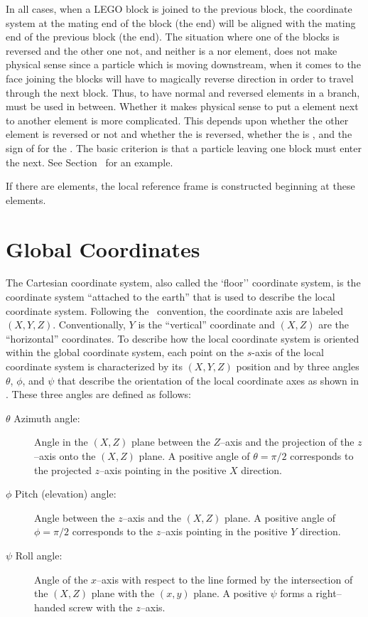 In all cases, when a LEGO block is joined to the previous block, the
coordinate system at the mating end of the block (the 
end) will be aligned with the mating end of the previous block (the
 end). The situation where one of the blocks is
reversed and the other one not, and neither is a  nor
 element, does not make physical sense since a
particle which is moving downstream, when it comes to the face joining
the blocks will have to magically reverse direction in order to travel
through the next block. Thus, to have normal and reversed elements in
a branch,   must be used in between.
Whether it makes physical sense to put a  element next to
another element is more complicated. This depends upon whether the
other element is reversed or not and whether the  is
reversed, whether the  is , and the sign of
 for the . The basic criterion is that a
particle leaving one block must enter the next. See
Section~ for an example.

If there are  elements, the local reference frame is
constructed beginning at these elements.

\section{Global Coordinates}
\label{s:global}

The Cartesian  coordinate system, also called the `floor''
coordinate system, is the coordinate system ``attached to the earth''
that is used to describe the local coordinate system. Following the
\mad\ convention, the  coordinate axis are labeled $(X, Y,
Z)$. Conventionally, $Y$ is the ``vertical'' coordinate and $(X, Z)$
are the ``horizontal'' coordinates. To describe how the local
coordinate system is oriented within the global coordinate system,
each point on the $s$-axis of the local coordinate system is
characterized by its $(X, Y, Z)$ position and by three angles $\theta$,
$\phi$, and $\psi$ that describe the orientation of the local coordinate axes
as shown in . These three angles are defined as
follows:
\begin{description}
\item[$\theta$ Azimuth angle:] Angle in the $(X, Z)$ plane 
between the $Z$--axis and the projection of the $z$--axis onto the
$(X, Z)$ plane. A positive angle of $\theta = \pi/2$ corresponds to the
projected $z$--axis pointing in the positive $X$ direction.
\item[$\phi$ Pitch (elevation) angle:] Angle between the $z$--axis 
and the $(X,Z)$ plane. A positive angle of $\phi = \pi/2$ corresponds to
the $z$--axis pointing in the positive $Y$ direction.
\item[$\psi$ Roll angle:] Angle of the $x$--axis with respect 
to the line formed by the
intersection of the $(X, Z)$ plane with the $(x, y)$ plane. A
positive $\psi$ forms a right--handed screw with the $z$--axis.
\end{description}

